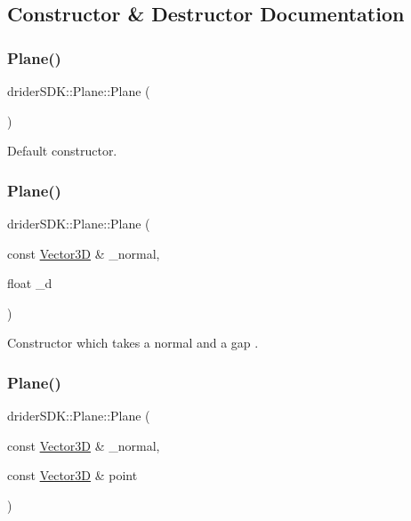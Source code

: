 \subsection{Constructor \& Destructor Documentation}
\mbox{\label{classdrider_s_d_k_1_1_plane_a57f51d0d638c01f39ccf0ae6ff8fa2c0}} 
\subsubsection{\texorpdfstring{Plane()}{Plane()}\hspace{0.1cm}{\footnotesize\ttfamily [1/5]}}
{\footnotesize\ttfamily drider\+S\+D\+K\+::\+Plane\+::\+Plane (\begin{DoxyParamCaption}{ }\end{DoxyParamCaption})}

Default constructor. \mbox{\label{classdrider_s_d_k_1_1_plane_adef490d98a9ef2feda51c5b9e499aa50}} 
\subsubsection{\texorpdfstring{Plane()}{Plane()}\hspace{0.1cm}{\footnotesize\ttfamily [2/5]}}
{\footnotesize\ttfamily drider\+S\+D\+K\+::\+Plane\+::\+Plane (\begin{DoxyParamCaption}\item[{const \hyperlink{classdrider_s_d_k_1_1_vector3_d}{Vector3D} \&}]{\+\_\+normal,  }\item[{float}]{\+\_\+d }\end{DoxyParamCaption})}

Constructor which takes a normal and a gap . \mbox{\label{classdrider_s_d_k_1_1_plane_a0560ff07d9e3b04b983a007f18470e23}} 
\subsubsection{\texorpdfstring{Plane()}{Plane()}\hspace{0.1cm}{\footnotesize\ttfamily [3/5]}}
{\footnotesize\ttfamily drider\+S\+D\+K\+::\+Plane\+::\+Plane (\begin{DoxyParamCaption}\item[{const \hyperlink{classdrider_s_d_k_1_1_vector3_d}{Vector3D} \&}]{\+\_\+normal,  }\item[{const \hyperlink{classdrider_s_d_k_1_1_vector3_d}{Vector3D} \&}]{point }\end{DoxyParamCaption})}

